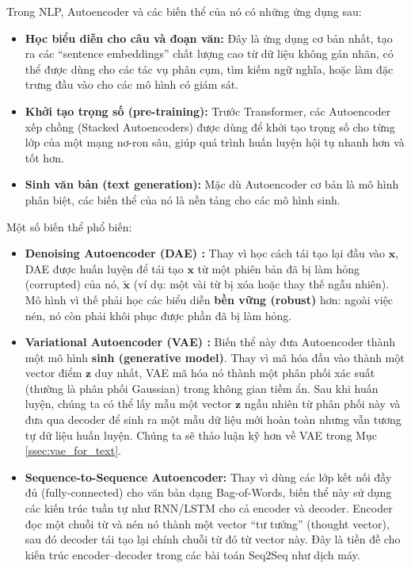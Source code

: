 Trong NLP, Autoencoder và các biến thể của nó có những ứng dụng sau:
\begin{itemize}
    \item \textbf{Học biểu diễn cho câu và đoạn văn:} Đây là ứng dụng cơ bản nhất, tạo ra các “sentence embeddings” chất lượng cao từ dữ liệu không gán nhãn, có thể được dùng cho các tác vụ phân cụm, tìm kiếm ngữ nghĩa, hoặc làm đặc trưng đầu vào cho các mô hình có giám sát.
    \item \textbf{Khởi tạo trọng số (pre-training):} Trước Transformer, các Autoencoder xếp chồng (Stacked Autoencoders) được dùng để khởi tạo trọng số cho từng lớp của một mạng nơ-ron sâu, giúp quá trình huấn luyện hội tụ nhanh hơn và tốt hơn.
    \item \textbf{Sinh văn bản (text generation):} Mặc dù Autoencoder cơ bản là mô hình phân biệt, các biến thể của nó là nền tảng cho các mô hình sinh.
\end{itemize}

Một số biến thể phổ biến:

\begin{itemize}
    \item \textbf{Denoising Autoencoder (DAE) \cite{vincent2008extracting}:} Thay vì học cách tái tạo lại đầu vào $\mathbf{x}$, DAE được huấn luyện để tái tạo $\mathbf{x}$ từ một phiên bản đã bị làm hỏng (corrupted) của nó, $\tilde{\mathbf{x}}$ (ví dụ: một vài từ bị xóa hoặc thay thế ngẫu nhiên). Mô hình vì thế phải học các biểu diễn \textbf{bền vững (robust)} hơn: ngoài việc nén, nó còn phải khôi phục được phần đã bị làm hỏng.
    \item \textbf{Variational Autoencoder (VAE) \cite{kingma2013auto}:} Biến thể này đưa Autoencoder thành một mô hình \textbf{sinh (generative model)}. Thay vì mã hóa đầu vào thành một vector điểm $\mathbf{z}$ duy nhất, VAE mã hóa nó thành một phân phối xác suất (thường là phân phối Gaussian) trong không gian tiềm ẩn. Sau khi huấn luyện, chúng ta có thể lấy mẫu một vector $\mathbf{z}$ ngẫu nhiên từ phân phối này và đưa qua decoder để sinh ra một mẫu dữ liệu mới hoàn toàn nhưng vẫn tương tự dữ liệu huấn luyện. Chúng ta sẽ thảo luận kỹ hơn về VAE trong Mục \ref{ssec:vae_for_text}.
    \item \textbf{Sequence-to-Sequence Autoencoder:} Thay vì dùng các lớp kết nối đầy đủ (fully-connected) cho văn bản dạng Bag-of-Words, biến thể này sử dụng các kiến trúc tuần tự như RNN/LSTM cho cả encoder và decoder. Encoder đọc một chuỗi từ và nén nó thành một vector “tư tưởng” (thought vector), sau đó decoder tái tạo lại chính chuỗi từ đó từ vector này. Đây là tiền đề cho kiến trúc encoder--decoder trong các bài toán Seq2Seq như dịch máy.
\end{itemize}
